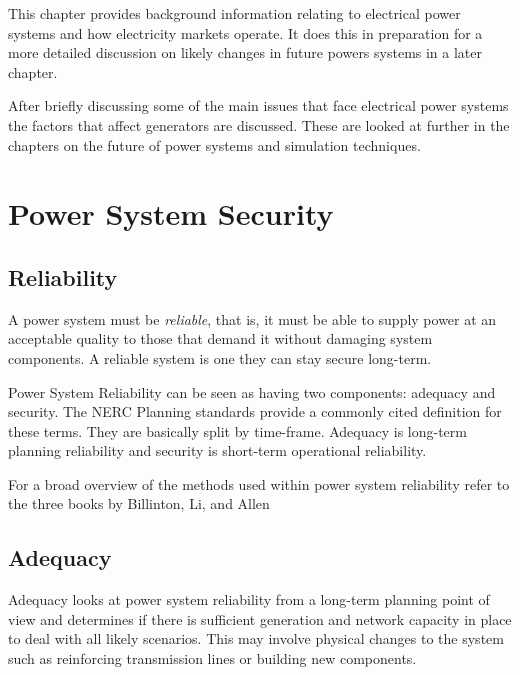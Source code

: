\documentclass[a4paper,oneside,12pt]{report}
\begin{document}
This chapter provides background information relating to electrical power systems and how electricity markets operate. It does this in preparation for a more detailed discussion on likely changes in future powers systems in a later chapter.

After briefly discussing some of the main issues that face electrical power systems the factors that affect generators are discussed. These are looked at further in the chapters on the future of power systems and simulation techniques.









\chapter{Power System Security}

\section{Reliability}

A power system must be \emph{reliable}, that is, it must be able to supply power at an acceptable quality to those that demand it without damaging system components. A reliable system is one they can stay secure long-term.

Power System Reliability can be seen as having two components: adequacy and security. The NERC Planning standards \cite{NERC1997} provide a commonly cited definition for these terms. They are basically split by time-frame. Adequacy is long-term planning reliability and security is short-term operational reliability.

For a broad overview of the methods used within power system reliability refer to the three books by Billinton, Li, and Allen \cite{Billinton1996,Billinton1994,Billinton1992}

\section{Adequacy}

Adequacy looks at power system reliability from a long-term planning point of view and determines if there is sufficient generation and network capacity in place to deal with all likely scenarios. This may involve physical changes to the system such as reinforcing transmission lines or building new components.
\end{document}
